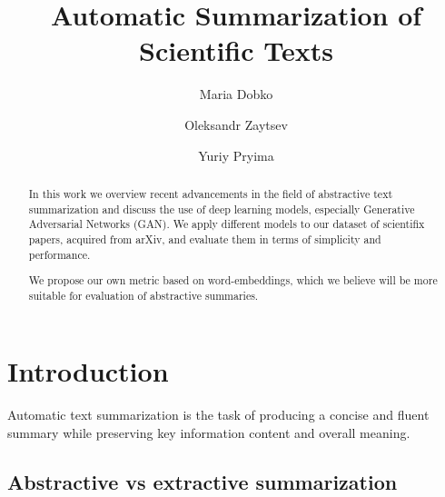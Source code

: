 \documentclass[sigplan]{acmart}
\begin{document}
\title{Automatic Summarization of Scientific Texts}

\author{Maria Dobko}

\author{Oleksandr Zaytsev}

\author{Yuriy Pryima}

\begin{abstract}

In this work we overview recent advancements in the field of abstractive text summarization and discuss the use of deep learning models, especially Generative Adversarial Networks (GAN). We apply different models to our dataset of scientifix papers, acquired from arXiv, and evaluate them in terms of simplicity and performance.

We propose our own metric based on word-embeddings, which we believe will be more suitable for evaluation of abstractive summaries.

\end{abstract}


\maketitle

\section{Introduction}

Automatic text summarization is the task of producing a concise and fluent summary while preserving key information content and overall meaning\cite{allahyari-17}.

\subsection{Abstractive vs extractive summarization}
\end{document}
